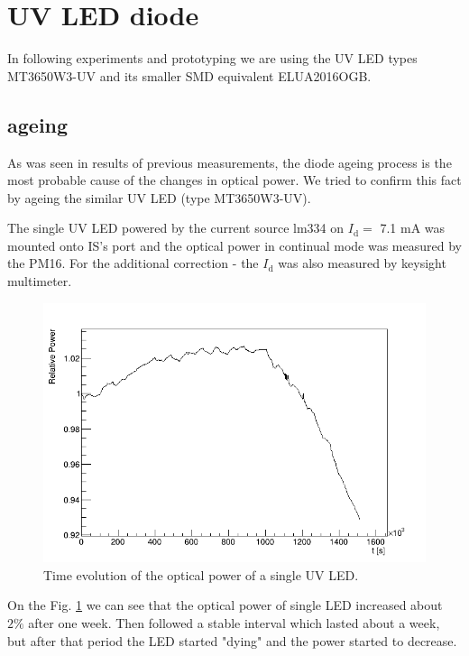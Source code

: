 \section{UV LED diode}

In following experiments and prototyping we are using the UV LED types MT3650W3-UV and its smaller SMD equivalent ELUA2016OGB.

\subsection{ageing}
As was seen in results of previous measurements, the diode ageing process is the most probable cause of the changes in optical power. We tried to confirm this fact by ageing the similar UV LED (type MT3650W3-UV).
\par
The single UV LED powered by the current source lm334 on $I_\textrm{d} =$ 7.1 mA was mounted onto IS's port and the optical power in continual mode was measured by the PM16. For the additional correction - the $I_\textrm{d} $ was also measured by keysight multimeter.


\par
\begin{figure}[H]
 \centering
 \includegraphics[scale=0.8]{./pictures/corrected1}
 \caption{Time evolution of the optical power of a single UV LED.}
 \label{SingleDiod}
\end{figure}
\par
On the Fig. \ref{SingleDiod} we can see that the optical power of single LED increased about $2 \%$ after one week. Then followed a stable interval which lasted about a week, but after that period the LED started "dying" and the power started to decrease.

